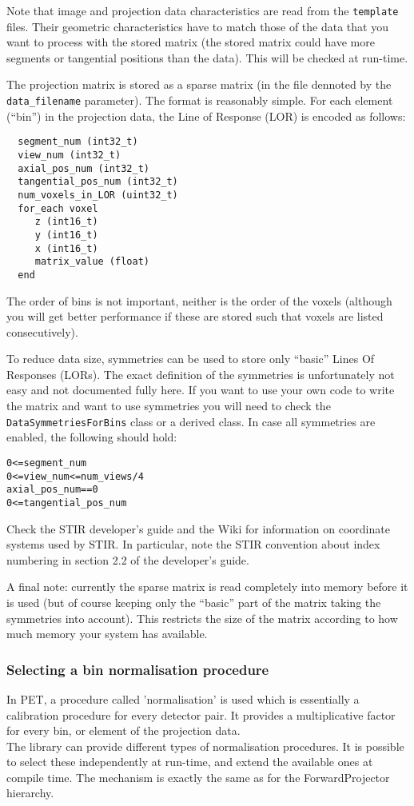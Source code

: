 \documentclass{article}
\begin{document}
Note that image and projection data characteristics are read from the \texttt{template} files. Their geometric
characteristics have to match those of the data that you want to process with the stored matrix
(the stored matrix could have more segments or tangential positions than the data). This will be
checked at run-time.

{ 
}

The projection matrix is stored as a sparse matrix (in the file dennoted by the \texttt{data\_filename}
parameter). The format is reasonably simple. For each element (``bin'') in the projection data, the 
Line of Response (LOR) is encoded as follows:
\begin{verbatim}
  segment_num (int32_t)
  view_num (int32_t)
  axial_pos_num (int32_t)
  tangential_pos_num (int32_t)
  num_voxels_in_LOR (uint32_t)
  for_each voxel
     z (int16_t)
     y (int16_t)
     x (int16_t)
     matrix_value (float)
  end
\end{verbatim}
The order of bins is not important, neither is the order of the voxels (although you will get better
performance if these are stored such that voxels are listed consecutively).

To reduce data size, symmetries can be used to store only ``basic'' Lines Of Responses (LORs). 
The exact definition of the symmetries is unfortunately
not easy and not documented fully here. If you want to use your own code to write the matrix and want to use
symmetries you will need to check the \texttt{DataSymmetriesForBins} class or a derived class. In case all
symmetries are enabled, the following should hold:
\begin{verbatim}
0<=segment_num
0<=view_num<=num_views/4
axial_pos_num==0
0<=tangential_pos_num
\end{verbatim}
Check the STIR developer's guide and the Wiki for information on coordinate systems used by STIR. In particular,
note the STIR convention about index numbering in section 2.2 of the developer's guide.

A final note: currently the sparse matrix is read completely into memory before it is used (but of course
keeping only the ``basic'' part of the matrix taking the symmetries into account). This restricts the size
of the matrix according to how much memory your system has available.

\subsubsection{
Selecting a bin normalisation procedure}
\label{sec:binnormalisation}
In PET, a procedure called 'normalisation' is used which is essentially 
a calibration procedure for every detector pair. It provides 
a multiplicative factor for every bin, or element of the projection 
data.\\
The library can provide different types of normalisation procedures. 
It is possible to select these independently at run-time, and 
extend the available ones at compile time. The mechanism is exactly 
the same as for the ForwardProjector hierarchy.
\end{document}
